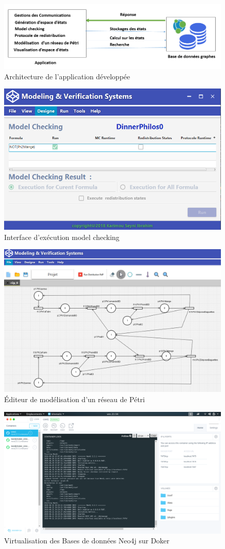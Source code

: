 \begin{figure} [h]
	\centering
	\includegraphics[width=0.7\linewidth]{img/architecture}
	\caption{Architecture de l'application développée}
	\label{fig:architecture}
\end{figure}
\begin{figure} [h]
	\centering
	\includegraphics[width=0.7\linewidth]{img/mcapp}
	\caption{Interface d'exécution model checking}
	\label{mc}
\end{figure}
\begin{figure}  
	\centering
	\includegraphics[width=0.7\linewidth]{img/apppetrinet}
	\caption{Éditeur de modélisation d'un réseau de Pétri} \label{apppetrinet}
	\label{fig:apppetrinet}
\end{figure}
\begin{figure} 
	\centering
	\includegraphics[width=0.7\linewidth]{img/clusterdocker}
	\caption{Virtualisation des Bases de données Neo4j sur Doker}
	\label{fig:clusterdocker}
\end{figure}
